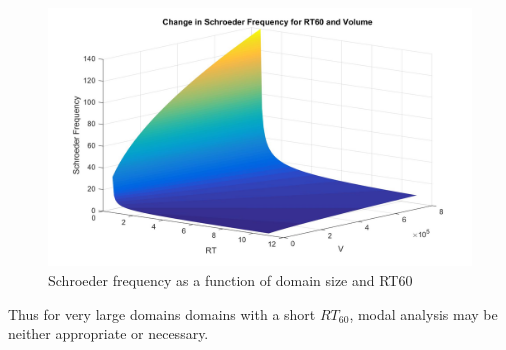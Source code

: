 \begin{figure}[H]
\centering
  \includegraphics[width=\textwidth]{./graphics/SchroederForRTandV.jpg}
  \caption{Schroeder frequency as a function of domain size and RT60}
\end{figure}

Thus for very large domains domains with a short $RT_{60}$, modal analysis may be neither appropriate or necessary.